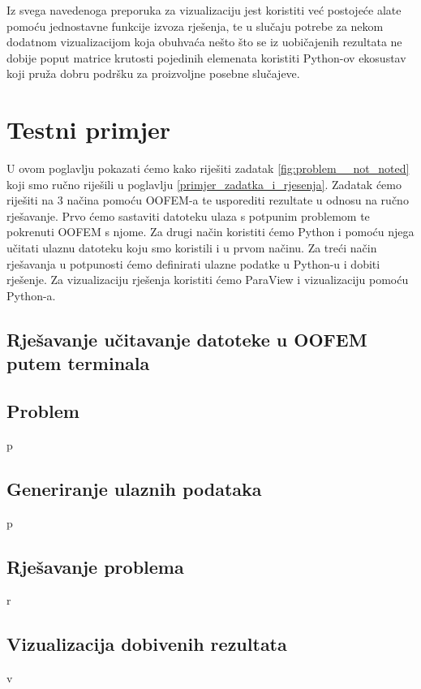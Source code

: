 \documentclass[a4paper,twoside,12pt]{memoir} %
\begin{document}
Iz svega navedenoga preporuka za vizualizaciju jest koristiti već postojeće alate pomoću jednostavne funkcije izvoza rješenja, te u slučaju potrebe za nekom dodatnom vizualizacijom koja obuhvaća nešto što se iz uobičajenih rezultata ne dobije poput matrice krutosti pojedinih elemenata koristiti Python-ov ekosustav koji pruža dobru podršku za proizvoljne posebne slučajeve.

\chapter{Testni primjer}
U ovom poglavlju pokazati ćemo kako riješiti zadatak \ref{fig:problem__not_noted} koji smo ručno riješili u poglavlju \ref{primjer_zadatka_i_rjesenja}. Zadatak ćemo riješiti na 3 načina pomoću OOFEM-a te usporediti rezultate u odnosu na ručno rješavanje. Prvo ćemo sastaviti datoteku ulaza s potpunim problemom te pokrenuti OOFEM s njome. Za drugi način koristiti ćemo Python i pomoću njega učitati ulaznu datoteku koju smo koristili i u prvom načinu. Za treći način rješavanja u potpunosti ćemo definirati ulazne podatke u Python-u i dobiti rješenje. Za vizualizaciju rješenja koristiti ćemo ParaView i vizualizaciju pomoću Python-a.

\section{Rješavanje učitavanje datoteke u OOFEM putem terminala}







\section{Problem}
p

\section{Generiranje ulaznih podataka}
p

\section{Rješavanje problema}
r

\section{Vizualizacija dobivenih rezultata}
v
\end{document}
